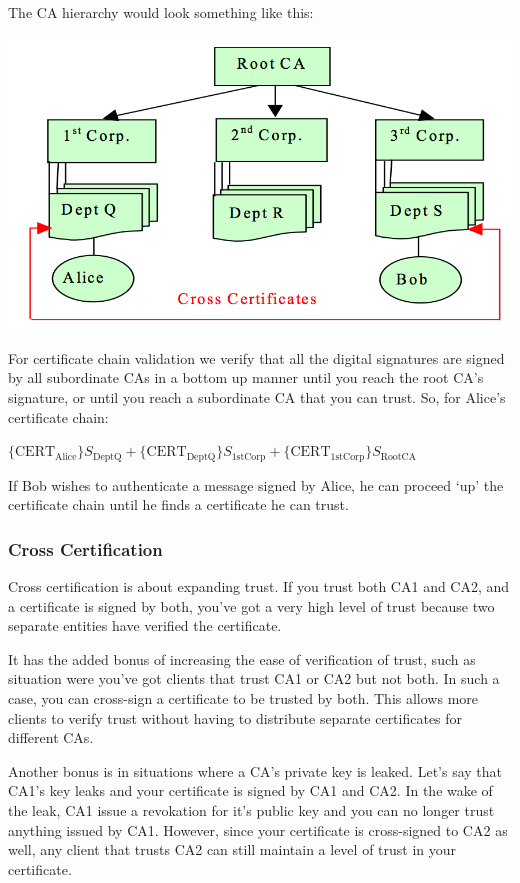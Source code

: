 \documentclass{article}
\begin{document}
The CA hierarchy would look something like this:
\begin{center}
  \includegraphics[scale=0.6]{CA-hierarchy.png}
\end{center}
For certificate chain validation we verify that all the digital signatures are signed by all subordinate CAs in a bottom up manner until you reach the root CA's signature, or until you reach a subordinate CA that you can trust. So, for Alice's certificate chain:
\begin{center}
  $\{\text{CERT}_{\text{Alice}}\}S_{\text{DeptQ}} + \{\text{CERT}_{\text{DeptQ}}\}S_{\text{1stCorp}} + \{\text{CERT}_{\text{1stCorp}}\}S_{\text{RootCA}}$
\end{center}
If Bob wishes to authenticate a message signed by Alice, he can proceed `up' the certificate chain until he finds a certificate he can trust.

\subsubsection{Cross Certification}
Cross certification is about expanding trust. If you trust both CA1 and CA2, and a certificate is signed by both, you've got a very high level of trust because two separate entities have verified the certificate.

It has the added bonus of increasing the ease of verification of trust, such as situation were you've got clients that trust CA1 or CA2 but not both. In such a case, you can cross-sign a certificate to be trusted by both. This allows more clients to verify trust without having to distribute separate certificates for different CAs.

Another bonus is in situations where a CA's private key is leaked. Let's say that CA1's key leaks and your certificate is signed by CA1 and CA2. In the wake of the leak, CA1 issue a revokation for it's public key and you can no longer trust anything issued by CA1. However, since your certificate is cross-signed to CA2 as well, any client that trusts CA2 can still maintain a level of trust in your certificate.
\end{document}
